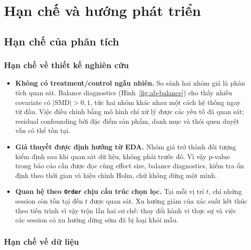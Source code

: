 
\section{Hạn chế và hướng phát triển}

\subsection{Hạn chế của phân tích}

\subsubsection{Hạn chế về thiết kế nghiên cứu}

\begin{itemize}
  \item \textbf{Không có treatment/control ngẫu nhiên.} So sánh hai nhóm giá là
  phân tích quan sát. Balance diagnostics (Hình~\ref{fig:ab-balance}) cho thấy
  nhiều covariate có $|\text{SMD}| > 0{,}1$, tức hai nhóm khác nhau một cách hệ
  thống ngay từ đầu. Việc điều chỉnh bằng mô hình chỉ xử lý được các yếu tố đã
  quan sát; residual confounding bởi đặc điểm sản phẩm, danh mục và thói quen
  duyệt vẫn có thể tồn tại.

  \item \textbf{Giả thuyết được định hướng từ EDA.} Nhóm giá trở thành đối tượng
  kiểm định sau khi quan sát dữ liệu, không phải trước đó. Vì vậy p-value trong
  báo cáo cần được đọc cùng effect size, balance diagnostics, kiểm tra ổn định
  theo thời gian và hiệu chỉnh Holm, chứ không đứng một mình.

  \item \textbf{Quan hệ theo \texttt{Order} chịu cấu trúc chọn lọc.} Tại mỗi vị
  trí $t$, chỉ những session còn tồn tại đến $t$ được quan sát. Xu hướng giảm của
  xác suất kết thúc theo tiến trình vì vậy trộn lẫn hai cơ chế: thay đổi hành vi
  thực sự và việc các session có xu hướng dừng sớm đã bị loại khỏi mẫu.
\end{itemize}

\subsubsection{Hạn chế về dữ liệu}

